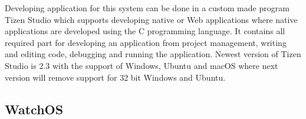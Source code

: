 Developing application for this system can be done in a custom made program Tizen Studio which supports developing native or Web applications where native applications are developed using the C programming language. It contains all required part for developing an application from project management, writing and editing code, debugging and running the application. Newest version of Tizen Studio is 2.3 with the support of Windows, Ubuntu and macOS where next version will remove support for 32 bit Windows and Ubuntu.


\subsection{WatchOS}\label{sec:WatchOS}